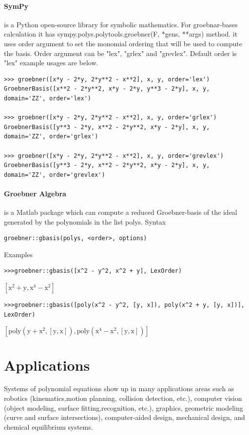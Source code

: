 \documentclass[11pt]{article}
\begin{document}
\paragraph{SymPy}\cite{sympyarticle}
is a Python open-source library for symbolic mathematics. For groebnar-bases calculation it has sympy.polys.polytools.groebner(F, *gens, **args) method.
it uses order argument to set the monomial ordering that will be used to compute the basis. Order argument can be "lex", "grlex" and "grevlex". Default order is "lex"
example usages are below.
\begin{verbatim}
>>> groebner([x*y - 2*y, 2*y**2 - x**2], x, y, order='lex')
GroebnerBasis([x**2 - 2*y**2, x*y - 2*y, y**3 - 2*y], x, y, domain='ZZ', order='lex')

>>> groebner([x*y - 2*y, 2*y**2 - x**2], x, y, order='grlex')
GroebnerBasis([y**3 - 2*y, x**2 - 2*y**2, x*y - 2*y], x, y, domain='ZZ', order='grlex')

>>> groebner([x*y - 2*y, 2*y**2 - x**2], x, y, order='grevlex')
GroebnerBasis([y**3 - 2*y, x**2 - 2*y**2, x*y - 2*y], x, y, domain='ZZ', order='grevlex')
\end{verbatim}

\paragraph{Groebner Algebra}
is a Matlab package which can compute a reduced Groebner-basis of the ideal generated by the polynomials in the list polys.
Syntax
\begin{verbatim}
groebner::gbasis(polys, <order>, options)
\end{verbatim}

Examples
\begin{verbatim}
>>>groebner::gbasis([x^2 - y^2, x^2 + y], LexOrder)
\end{verbatim}
$\mathrm{[x^2+y, x^4-x^2]}$

\begin{verbatim}
>>>groebner::gbasis([poly(x^2 - y^2, [y, x]), poly(x^2 + y, [y, x])], LexOrder)
\end{verbatim}
$\mathrm{[poly(y + x^2, [y,x]), poly(x^4 - x^2, [y,x])]}$

\section{Applications}
Systems of polynomial equations show up in many applications areas such as robotics (kinematics,motion planning, collision detection, etc.), computer vision (object modeling, surface fitting,recognition, etc.), graphics, geometric modeling (curve and surface intersections), computer-aided design, mechanical design, and chemical equilibrium systems. \cite{yanbinjiaArticle}
\end{document}
